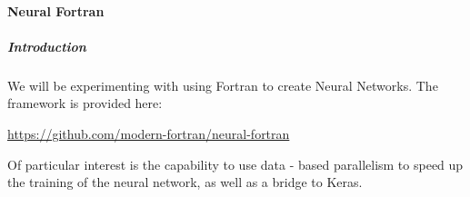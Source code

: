 \paragraph{Neural Fortran}

\subparagraph{Introduction}

We will be experimenting with using Fortran to create Neural Networks.  The framework is provided here:

\href{https://github.com/modern-fortran/neural-fortran}{https://github.com/modern-fortran/neural-fortran}

Of particular interest is the capability to use data - based parallelism to speed up the training of the neural network, as well as a bridge to Keras.